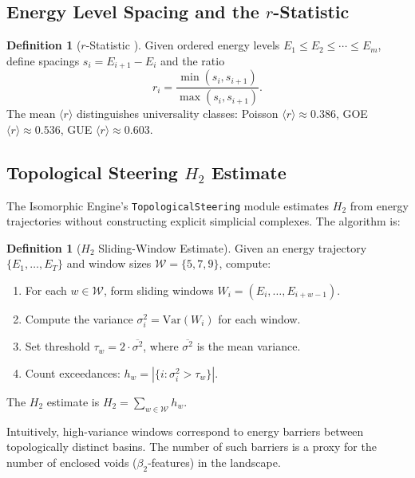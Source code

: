 \documentclass[12pt,a4paper]{article}
\theoremstyle{definition}\newtheorem{definition}[theorem]{Definition}
\theoremstyle{remark}\newtheorem{remark}[theorem]{Remark}
\newcommand{\Htwo}{H_2}
\begin{document}
\subsection{Energy Level Spacing and the $r$-Statistic}

\begin{definition}[$r$-Statistic \cite{oganesyan2007}]
\label{def:rstat}
Given ordered energy levels $E_1 \leq E_2 \leq \cdots \leq E_m$, define
spacings $s_i = E_{i+1} - E_i$ and the ratio
\begin{equation}
  r_i = \frac{\min(s_i, s_{i+1})}{\max(s_i, s_{i+1})}.
\end{equation}
The mean $\langle r \rangle$ distinguishes universality classes: Poisson
$\langle r \rangle \approx 0.386$, GOE $\langle r \rangle \approx 0.536$,
GUE $\langle r \rangle \approx 0.603$.
\end{definition}

\subsection{Topological Steering $\Htwo$ Estimate}

The Isomorphic Engine's \texttt{TopologicalSteering} module estimates
$\Htwo$ from energy trajectories without constructing explicit simplicial
complexes. The algorithm is:

\begin{definition}[$\Htwo$ Sliding-Window Estimate]
\label{def:h2}
Given an energy trajectory $\{E_1, \ldots, E_T\}$ and window sizes
$\mathcal{W} = \{5, 7, 9\}$, compute:
\begin{enumerate}
  \item For each $w \in \mathcal{W}$, form sliding windows $W_i = (E_i, \ldots, E_{i+w-1})$.
  \item Compute the variance $\sigma^2_i = \mathrm{Var}(W_i)$ for each window.
  \item Set threshold $\tau_w = 2 \cdot \overline{\sigma^2}$, where $\overline{\sigma^2}$ is the mean variance.
  \item Count exceedances: $h_w = |\{i : \sigma^2_i > \tau_w\}|$.
\end{enumerate}
The $\Htwo$ estimate is $\Htwo = \sum_{w \in \mathcal{W}} h_w$.
\end{definition}

Intuitively, high-variance windows correspond to energy barriers between
topologically distinct basins. The number of such barriers is a proxy for
the number of enclosed voids ($\beta_2$-features) in the landscape.
\end{document}
